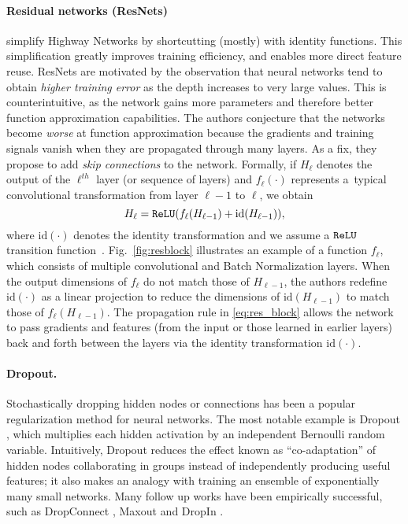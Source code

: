 \documentclass[runningheads]{llncs}
\begin{document}
\paragraph{\textbf{Residual networks (ResNets)}\cite{he2015deep}} simplify Highway Networks by shortcutting (mostly) with identity functions. This simplification greatly improves training efficiency, and enables more direct feature reuse. ResNets are motivated by the observation that neural networks tend to obtain \emph{higher training error} as the depth increases to very large values. This is counterintuitive, as the network gains more parameters and therefore better function approximation capabilities. The authors conjecture that the networks become \emph{worse} at function approximation because the gradients and training signals vanish when they are propagated through many layers. As a fix, they propose to add \emph{skip connections} to the network. Formally, if $H_\ell$ denotes the output of the $\ell^{th}$ layer (or sequence of layers) and $f_\ell(\cdot)$ represents a\ typical convolutional transformation from layer $\ell\!-\!1$ to $\ell$, we obtain
\begin{equation}
\label{eq:res_block}
 H_{\ell} = {\tt ReLU} (f_\ell( H_{\ell-1}) + \text{id} (H_{\ell-1})),
\end{equation}
where $\text{id}(\cdot)$ denotes the identity transformation and we assume a ${\tt ReLU}$ transition function~\cite{nair2010rectified}. Fig.~\ref{fig:resblock} illustrates an example of a function $f_\ell$, which consists of multiple convolutional and Batch Normalization layers.
When the output dimensions of $f_\ell$ do not match those of $H_{\ell-1}$, the authors redefine $\text{id}(\cdot)$ as a linear projection to reduce the dimensions of $\text{id}(H_{\ell-1})$ to match those of $f_\ell(H_{\ell-1})$.
The propagation rule in \eqref{eq:res_block} allows the network to pass gradients and features (from the input or those learned in earlier layers) back and forth between the layers via the identity transformation $\text{id}(\cdot)$.

\paragraph{\textbf{Dropout.}} Stochastically dropping hidden nodes or connections has been a popular regularization method for neural networks. The most notable example is Dropout \cite{srivastava2014dropout}, which multiplies each hidden activation by an independent Bernoulli random variable. Intuitively, Dropout reduces the effect known as ``co-adaptation'' of hidden nodes collaborating in groups instead of independently producing useful features; it also makes an analogy with training an ensemble of exponentially many small networks. Many follow up works have been empirically successful, such as DropConnect \cite{icml2013_wan13}, Maxout \cite{goodfellow2013maxout} and DropIn \cite{smith2015gradual}.
\end{document}
